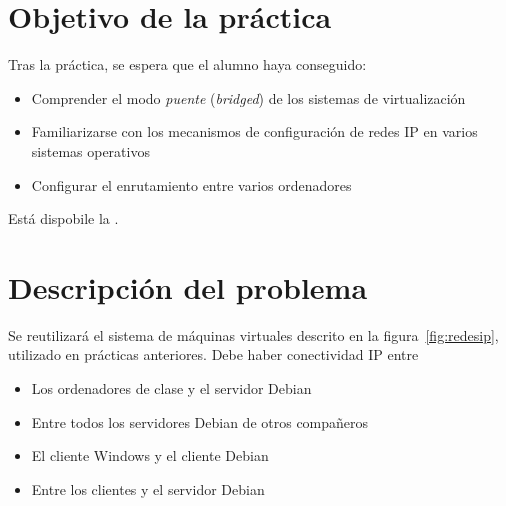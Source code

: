 
\usepackage{eurosym}
\usepackage{needspace}




\renewcommand{\hmwkTitle}{Práctica enrutamiento IP}
\renewcommand{\hmwkClass}{Planificación y Administración de Redes}

\usepackage{blindtext}






\primerapagina

\setlength{\parindent}{1em}
\setlength{\parskip}{1em}

\section{Objetivo de la práctica}
Tras la práctica, se espera que el alumno haya conseguido:
\begin{itemize}
\item Comprender el modo \textit{puente} (\textit{bridged}) de los sistemas de virtualización
\item Familiarizarse con los  mecanismos de configuración de redes IP en varios sistemas operativos
\item Configurar el enrutamiento entre varios ordenadores
\end{itemize}

Está dispobile la .



\section{Descripción del problema}
Se reutilizará el sistema de máquinas virtuales descrito en la figura~\ref{fig:redesip}, utilizado en prácticas anteriores. Debe haber conectividad IP entre
\begin{itemize}
\item Los ordenadores de clase y el servidor Debian
\item Entre todos los servidores Debian de otros compañeros
\item El cliente Windows y el cliente Debian
\item Entre los clientes y el servidor Debian
\end{itemize}

